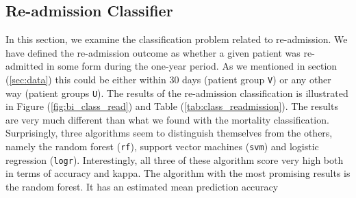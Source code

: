 \documentclass[../thesis.tex]{subfiles}
\begin{document}
\subsection{Re-admission Classifier}

\noindent In this section, we examine the classification problem related to re-admission. We have defined the re-admission outcome as whether a given patient was re-admitted in some form during the one-year period. As we mentioned in section (\ref{sec:data}) this could be either within 30 days (patient group \texttt{V}) or any other way (patient groups \texttt{U}). The results of the re-admission classification is illustrated in Figure (\ref{fig:bi_class_read}) and Table (\ref{tab:class_readmission}). The results are very much different than what we found with the mortality classification. Surprisingly, three algorithms seem to distinguish themselves from the others, namely the random forest (\texttt{rf}), support vector machines (\texttt{svm}) and logistic regression (\texttt{logr}). Interestingly, all three of these algorithm score very high both in terms of accuracy and kappa. The algorithm with the most promising results is the random forest. It has an estimated mean prediction accuracy

\vspace*{-0,1cm}
\end{document}
